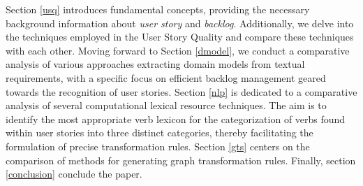 Section \ref{usq} introduces fundamental concepts, providing the necessary background information about \emph{user story} and \emph{backlog}. Additionally, we delve into the techniques employed in the User Story Quality and compare these techniques with each other. Moving forward to Section \ref{dmodel}, we conduct a comparative analysis of various approaches extracting domain models from textual requirements, with a specific focus on efficient backlog management geared towards the recognition of user stories. Section \ref{nlp} is dedicated to a comparative analysis of several computational lexical resource techniques. The aim is to identify the most appropriate verb lexicon for the categorization of verbs found within user stories into three distinct categories, thereby facilitating the formulation of precise transformation rules. Section \ref{gts} centers on the comparison of methods for generating graph transformation rules. Finally, section \ref{conclusion} conclude the paper. 
